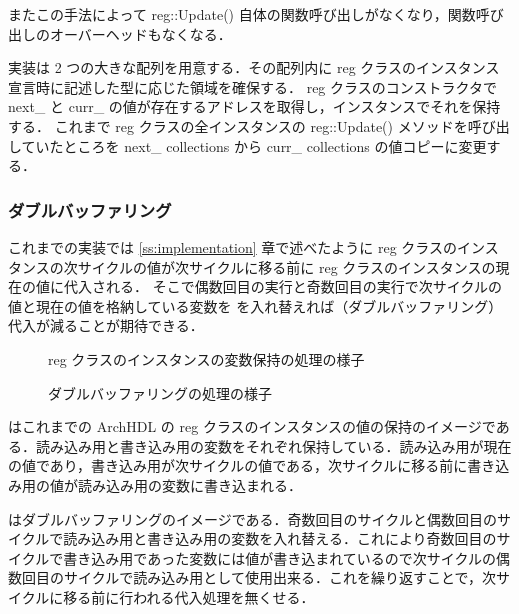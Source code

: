 またこの手法によって reg::Update() 自体の関数呼び出しがなくなり，関数呼び出しのオーバーヘッドもなくなる．

実装は 2 つの大きな配列を用意する．その配列内に reg クラスのインスタンス宣言時に記述した型に応じた領域を確保する．
reg クラスのコンストラクタで next\_ と curr\_ の値が存在するアドレスを取得し，インスタンスでそれを保持する．
これまで reg クラスの全インスタンスの reg::Update() メソッドを呼び出していたところを next\_ collections から curr\_ collections の値コピーに変更する．


\subsubsection{ダブルバッファリング}

これまでの実装では \ref{ss:implementation} 章で述べたように reg
クラスのインスタンスの次サイクルの値が次サイクルに移る前に reg
クラスのインスタンスの現在の値に代入される．
そこで偶数回目の実行と奇数回目の実行で次サイクルの値と現在の値を格納している変数を
を入れ替えれば（ダブルバッファリング）代入が減ることが期待できる．

\begin{figure}[t]
 \begin{center}
  
 \end{center}
 \caption{reg クラスのインスタンスの変数保持の処理の様子}
 \label{fig:reg_curr_next}
\end{figure}

\begin{figure}[t]
 \begin{center}
  
 \end{center}
 \caption{ダブルバッファリングの処理の様子}
 \label{fig:double_buffer}
\end{figure}

 はこれまでの ArchHDL の reg
クラスのインスタンスの値の保持のイメージである．読み込み用と書き込み用の変数をそれぞれ保持している．読み込み用が現在の値であり，書き込み用が次サイクルの値である，次サイクルに移る前に書き込み用の値が読み込み用の変数に書き込まれる．

はダブルバッファリングのイメージである．奇数回目のサイクルと偶数回目のサイクルで読み込み用と書き込み用の変数を入れ替える．これにより奇数回目のサイクルで書き込み用であった変数には値が書き込まれているので次サイクルの偶数回目のサイクルで読み込み用として使用出来る．これを繰り返すことで，次サイクルに移る前に行われる代入処理を無くせる．

